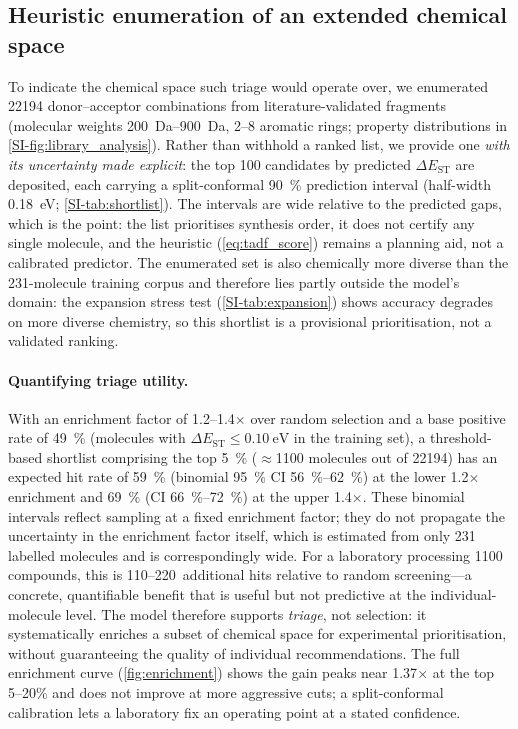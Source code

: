\subsection{Heuristic enumeration of an extended chemical space}\label{subsec:library}

To indicate the chemical space such triage would operate over, we enumerated
\num{22194} donor--acceptor combinations from literature-validated fragments
(molecular weights \qtyrange{200}{900}{\dalton}, \numrange{2}{8} aromatic rings;
property distributions in \cref{SI-fig:library_analysis}). Rather than withhold a ranked list, we provide one
\emph{with its uncertainty made explicit}: the top \num{100} candidates by predicted
$\Delta E_\text{ST}$ are deposited, each carrying a split-conformal
\qty{90}{\percent} prediction interval (half-width \qty{0.18}{\electronvolt};
\cref{SI-tab:shortlist}). The intervals are wide relative to the predicted gaps, which
is the point: the list prioritises synthesis order, it does not certify any
single molecule, and the heuristic (\cref{eq:tadf_score}) remains a planning aid, not a
calibrated predictor. The enumerated set is also chemically more diverse than the
\num{231}-molecule training corpus and therefore lies partly outside the model's domain:
the expansion stress test (\cref{SI-tab:expansion}) shows accuracy degrades on more
diverse chemistry, so this shortlist is a provisional prioritisation, not a validated
ranking.

\paragraph{Quantifying triage utility.}
With an enrichment factor of \numrange{1.2}{1.4}$\times$ over random selection and
a base positive rate of \qty{49}{\percent} (molecules with
$\Delta E_\text{ST} \le \qty{0.10}{\electronvolt}$ in the training set),
a threshold-based shortlist comprising the top \qty{5}{\percent}
($\approx$\num{1100} molecules out of \num{22194}) has an expected hit rate of
\qty{59}{\percent} (binomial \qty{95}{\percent} CI \qtyrange{56}{62}{\percent}) at the
lower \num{1.2}$\times$ enrichment and \qty{69}{\percent} (CI \qtyrange{66}{72}{\percent})
at the upper \num{1.4}$\times$. These binomial intervals reflect sampling at a fixed
enrichment factor; they do not propagate the uncertainty in the enrichment factor itself,
which is estimated from only \num{231} labelled molecules and is correspondingly wide.
For a laboratory processing \num{1100} compounds, this is
\numrange{110}{220}~additional hits relative to random screening---a concrete,
quantifiable benefit that is useful but not predictive at the individual-molecule level.
The model therefore supports \emph{triage}, not selection: it systematically
enriches a subset of chemical space for experimental prioritisation,
without guaranteeing the quality of individual recommendations. The full
enrichment curve (\cref{fig:enrichment}) shows the gain peaks near
\num{1.37}$\times$ at the top \numrange{5}{20}\% and does not improve at more
aggressive cuts; a split-conformal calibration lets a laboratory fix an operating
point at a stated confidence.

